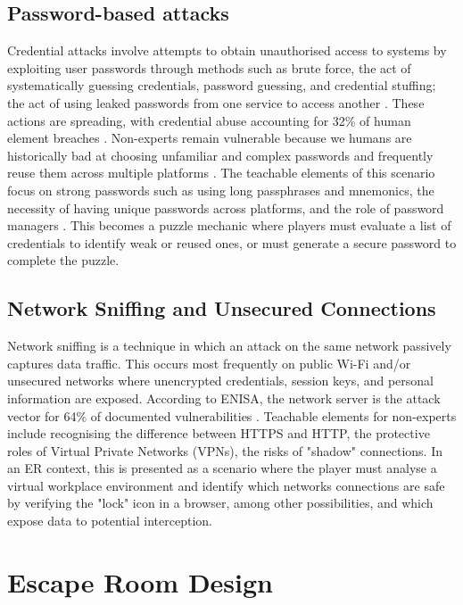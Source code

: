 \documentclass[sigconf, authorversion=true, nonacm=true]{acmart}%
\begin{document}
\subsection{Password-based attacks}

Credential attacks involve attempts to obtain unauthorised access to systems by exploiting user passwords through methods such as brute force, the act of systematically guessing credentials, password guessing, and credential stuffing; the act of using leaked passwords from one service to access another \cite{spatafora_educational_2024, verizon_dbir_2025}. These actions are spreading, with credential abuse accounting for 32\% of human element breaches \cite{verizon_dbir_2025}. 
Non-experts remain vulnerable because we humans are historically bad at choosing unfamiliar and complex passwords and frequently reuse them across multiple platforms \cite{spatafora_educational_2024, verizon_dbir_2025}. The teachable elements of this scenario focus on strong passwords such as using long passphrases and mnemonics, the necessity of having unique passwords across platforms, and the role of password managers \cite{sans_security_awareness_2025}. This becomes a puzzle mechanic where players must evaluate a list of credentials to identify weak or reused ones, or must generate a secure password to complete the puzzle.


\subsection{Network Sniffing and Unsecured Connections}

Network sniffing is a technique in which an attack on the same network passively captures data traffic. This occurs most frequently on public Wi-Fi and/or unsecured networks where unencrypted credentials, session keys, and personal information are exposed. According to ENISA, the network server is the attack vector for 64\% of documented vulnerabilities \cite{noauthor_threat_2025}.
Teachable elements for non-experts include recognising the difference between HTTPS and HTTP, the protective roles of Virtual Private Networks (VPNs), the risks of "shadow" connections. In an ER context, this is presented as a scenario where the player must analyse a virtual workplace environment and identify which networks connections are safe by verifying the "lock" icon in a browser, among other possibilities, and which expose data to potential interception.


\section{Escape Room Design}
\end{document}
